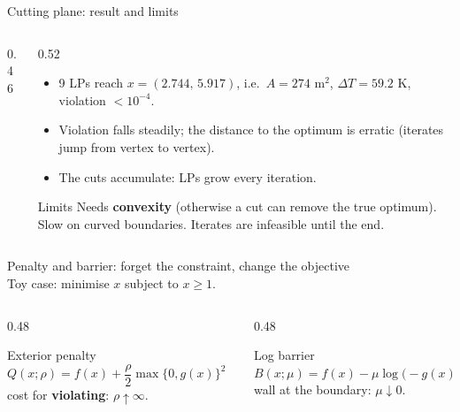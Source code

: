 \begin{frame}{Cutting plane: result and limits}
  \begin{columns}[T]
    \begin{column}{0.46\textwidth}
    \end{column}
    \begin{column}{0.52\textwidth}
      \small
      \begin{itemize}
        \item 9 LPs reach $x=(2.744,\,5.917)$, i.e.\ $A=274$ m$^2$, $\Delta T=59.2$ K, violation $<10^{-4}$.
        \item Violation falls steadily; the distance to the optimum is erratic (iterates jump from vertex to vertex).
        \item The cuts accumulate: LPs grow every iteration.
      \end{itemize}
      \begin{alertblock}{Limits}
        Needs \textbf{convexity} (otherwise a cut can remove the true optimum). Slow on curved boundaries. Iterates are infeasible until the end.
      \end{alertblock}
    \end{column}
  \end{columns}
\end{frame}

\begin{frame}{Penalty and barrier: forget the constraint, change the objective}
  \centering
  \\
  \small Toy case: minimise $x$ subject to $x\ge1$.
  \begin{columns}[T]
    \begin{column}{0.48\textwidth}
      \begin{block}{Exterior penalty}
        $Q(x;\rho)=f(x)+\dfrac\rho2\max\{0,g(x)\}^2$\\ cost for \textbf{violating}: $\rho\uparrow\infty$.
      \end{block}
    \end{column}
    \begin{column}{0.48\textwidth}
      \begin{block}{Log barrier}
        $B(x;\mu)=f(x)-\mu\log\bigl(-g(x)\bigr)$\\ wall at the boundary: $\mu\downarrow0$.
      \end{block}
    \end{column}
  \end{columns}
\end{frame}

